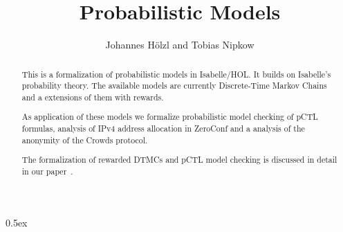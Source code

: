 \documentclass[11pt,a4paper]{article}
\begin{document}
\title{Probabilistic Models}
\author{Johannes H\"olzl and Tobias Nipkow}
\maketitle

\begin{abstract}
This is a formalization of probabilistic models in Isabelle/HOL. It builds on
Isabelle's probability theory. The available models are currently Discrete-Time
Markov Chains and a extensions of them with rewards.

As application of these models we formalize probabilistic model checking of pCTL
formulas, analysis of IPv4 address allocation in ZeroConf and a analysis of the
anonymity of the Crowds protocol.

The formalization of rewarded DTMCs and pCTL model checking is discussed in
detail in our paper~\cite{hoelzl2012verifyingpctl}.
\end{abstract}

\tableofcontents

\parindent 0pt\parskip 0.5ex





\end{document}
